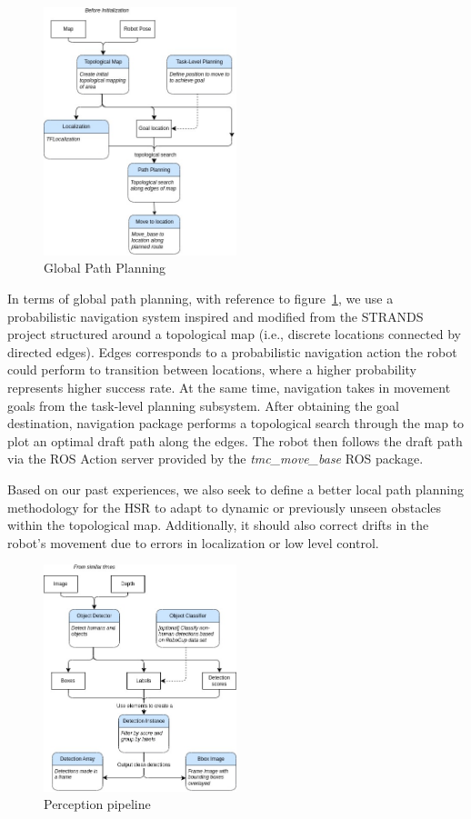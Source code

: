 \documentclass[runningheads,a4paper]{llncs}
\begin{document}
\begin{figure}
	\centering
	\includegraphics[width=0.5\textwidth]{images/orion_navigation.jpg}
	\caption{\label{fig:navigation_dataflow} Global Path Planning}
\end{figure}


In terms of global path planning, with reference to figure~\ref{fig:navigation_dataflow}, we use a probabilistic navigation system inspired and modified from the STRANDS \cite{strands@ram,lacerda_ijrr19} project structured around a topological map (i.e., discrete locations connected by directed edges). Edges corresponds to a probabilistic navigation action the robot could perform to transition between locations, where a higher probability represents higher success rate. At the same time, navigation takes in movement goals from the task-level planning subsystem. After obtaining the goal destination, navigation package performs a topological search through the map to plot an optimal draft path along the edges. The robot then follows the draft path via the ROS Action server provided by the \emph{tmc\_move\_base} ROS package. 

Based on our past experiences, we also seek to define a better local path planning methodology for the HSR to adapt to dynamic or previously unseen obstacles within the topological map. Additionally, it should also correct drifts in the robot's movement due to errors in localization or low level control. 

\begin{figure}
	\centering
	\includegraphics[width=0.5\textwidth]{images/orion_perception.jpg}
	\caption{\label{fig:perception_dataflow} Perception pipeline}
\end{figure}
\end{document}
